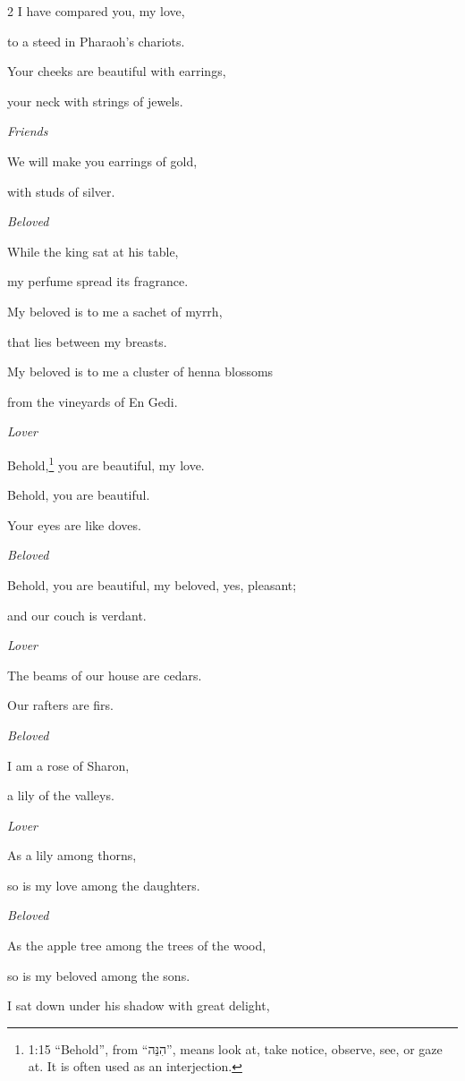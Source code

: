 \begin{multicols}{2}
\myverse{}I have compared you, my love,

to a steed in Pharaoh’s chariots.

\myverse{}Your cheeks are beautiful with earrings,

your neck with strings of jewels.


\textit{Friends}

\myverse{}We will make you earrings of gold,

with studs of silver.


\textit{Beloved}

\myverse{}While the king sat at his table,

my perfume spread its fragrance.

\myverse{}My beloved is to me a sachet of myrrh,

that lies between my breasts.

\myverse{}My beloved is to me a cluster of henna blossoms

from the vineyards of En Gedi.


\textit{Lover}

\myverse{}Behold,\footnote{1:15 “Behold”, from “הִנֵּה”, means look at, take notice, observe, see, or gaze at. It is
	often used as an interjection.} you are beautiful, my love.

Behold, you are beautiful.

Your eyes are like doves.


\textit{Beloved}

\myverse{}Behold, you are beautiful, my beloved, yes, pleasant;

and our couch is verdant.


\textit{Lover}

\myverse{}The beams of our house are cedars.

Our rafters are firs.


\mychapter{}\textit{Beloved}

\myverse*{}I am a rose of Sharon,

a lily of the valleys.


\textit{Lover}

\myverse{}As a lily among thorns,

so is my love among the daughters.


\textit{Beloved}

\myverse{}As the apple tree among the trees of the wood,

so is my beloved among the sons.

I sat down under his shadow with great delight,


\end{multicols}
